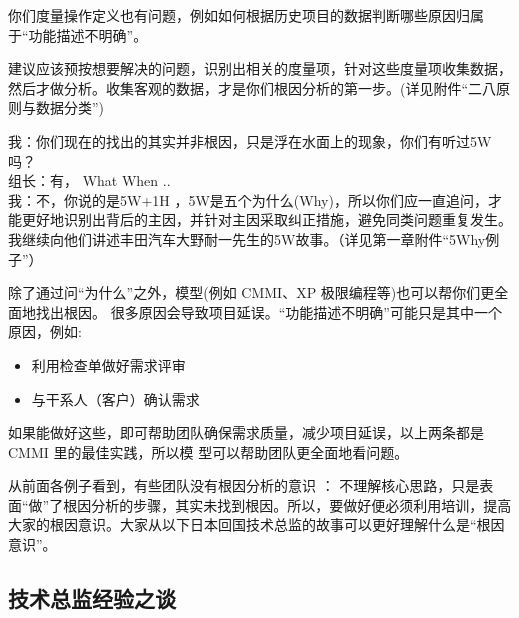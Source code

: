 你们度量操作定义也有问题，例如如何根据历史项目的数据判断哪些原因归属于“功能描述不明确”。

建议应该预按想要解决的问题，识别出相关的度量项，针对这些度量项收集数据，然后才做分析。收集客观的数据，才是你们根因分析的第一步。(详见附件“二八原则与数据分类”)

\begin{description}
\item[]
\begin{description}
\tightlist
\item[]
= = =
\end{description}
\end{description}

我：你们现在的找出的其实并非根因，只是浮在水面上的现象，你们有听过5W吗？\\
组长：有， What When ..\\
我：不，你说的是5W+1H
，5W是五个为什么(Why)，所以你们应一直追问，才能更好地识别出背后的主因，并针对主因采取纠正措施，避免同类问题重复发生。\\
我继续向他们讲述丰田汽车大野耐一先生的5W故事。（详见第一章附件“5Why例子”）

除了通过问``为什么''之外，模型(例如 CMMI、XP
极限编程等)也可以帮你们更全面地找出根因。
很多原因会导致项目延误。``功能描述不明确''可能只是其中一个原因，例如:

\begin{itemize}
\tightlist
\item
  利用检查单做好需求评审
\item
  与干系人（客户）确认需求
\end{itemize}

如果能做好这些，即可帮助团队确保需求质量，减少项目延误，以上两条都是
CMMI 里的最佳实践，所以模 型可以帮助团队更全面地看问题。


从前面各例子看到，有些团队没有根因分析的意识 ：
不理解核心思路，只是表面``做''了根因分析的步骤，其实未找到根因。所以，要做好便必须利用培训，提高大家的根因意识。大家从以下日本回国技术总监的故事可以更好理解什么是``根因意识''。

\hypertarget{ux6280ux672fux603bux76d1ux7ecfux9a8cux4e4bux8c08}{%
\subsection{技术总监经验之谈}\label{ux6280ux672fux603bux76d1ux7ecfux9a8cux4e4bux8c08}}

